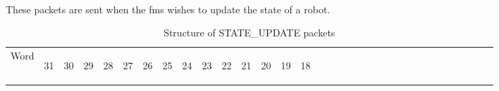 \documentclass[11pt]{article}
\begin{document}
\paragraph{}
These packets are sent when the \acrshort{fms} wishes to update the state of a robot.
\newline
\begin{table}[h!]
    \centering
    \label{tab:stateUpdateDef}
    \caption{Structure of STATE\_UPDATE packets}
    \begin{tabular}{|p{1cm}|m{0.04cm}|m{0.04cm}|m{0.04cm}|m{0.04cm}|m{0.04cm}|m{0.04cm}|m{0.04cm}|m{0.04cm}|m{0.04cm}|
        m{0.04cm}|m{0.04cm}|m{0.04cm}|m{0.04cm}|m{0.04cm}|m{0.04cm}|m{0.04cm}|m{0.04cm}|m{0.04cm}|m{0.04cm}|m{0.04cm}|
        m{0.04cm}|m{0.04cm}|m{0.04cm}|m{0.04cm}|m{0.04cm}|m{0.04cm}|m{0.04cm}|m{0.04cm}|m{0.04cm}|m{0.04cm}|m{0.04cm}|m{0.04cm}|}
        \hline
        Word & 
        \begin{sideways}31\end{sideways} &
        \begin{sideways}30\end{sideways} & 
        \begin{sideways}29\end{sideways} &
        \begin{sideways}28\end{sideways} &
        \begin{sideways}27\end{sideways} &
        \begin{sideways}26\end{sideways} &
        \begin{sideways}25\end{sideways} &
        \begin{sideways}24\end{sideways} &
        \begin{sideways}23\end{sideways} &
        \begin{sideways}22\end{sideways} &
        \begin{sideways}21\end{sideways} &
        \begin{sideways}20\end{sideways} &
        \begin{sideways}19\end{sideways} &
        \begin{sideways}18\end{sideways} &

\end{tabular}
\end{table}
\end{document}
